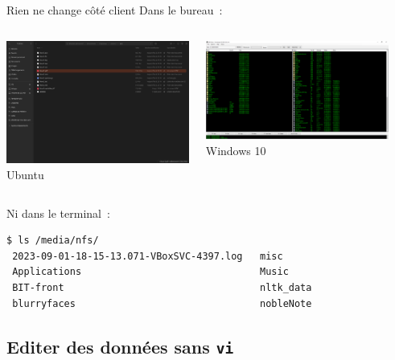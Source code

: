 \documentclass{beamer}
\begin{document}
    \begin{frame}[fragile]{Rien ne change côté client}
        Dans le bureau~:
        \begin{columns}
            \begin{center}
                \includegraphics[width=6cm]{image/nfs-linux} \\ Ubuntu \\
            \end{center}
            \begin{center}
                \includegraphics[width=6cm]{image/nfs-windows} \\ Windows 10 \\
            \end{center}
        \end{columns}
        \bigbreak
        Ni dans le terminal~:
        \begin{lstlisting}[language=bash]
$ ls /media/nfs/
 2023-09-01-18-15-13.071-VBoxSVC-4397.log   misc
 Applications                               Music
 BIT-front                                  nltk_data
 blurryfaces                                nobleNote
        \end{lstlisting}
    \end{frame}
    \subsection{Editer des données sans \lstinline{vi}}\label{subsec:edit-whithout-vi}
\end{document}
